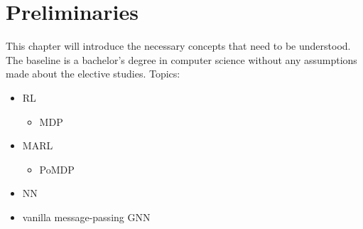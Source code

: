
\chapter{Preliminaries}
This chapter will introduce the necessary concepts that need to be understood. The baseline is a bachelor's degree in computer science without any assumptions made about the elective studies.
Topics:
\begin{itemize}[noitemsep,nolistsep]
	\item RL
	\begin{itemize}[noitemsep,nolistsep]
		\item MDP
	\end{itemize}
	\item MARL
	\begin{itemize}[noitemsep,nolistsep]
		\item PoMDP
	\end{itemize}
	\item NN
	\item vanilla message-passing GNN
\end{itemize}